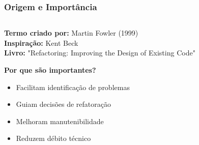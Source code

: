 \documentclass[aspectratio=169]{beamer}
\begin{document}
\begin{frame}
\frametitle{Origem e Importância}
\begin{columns}
\begin{column}{0.6\textwidth}
\footnotesize
\textbf{Termo criado por:} Martin Fowler (1999) \\
\textbf{Inspiração:} Kent Beck \\
\textbf{Livro:} "Refactoring: Improving the Design of Existing Code"

\vspace{0.5cm}
\textbf{Por que são importantes?}
\begin{itemize}
    \item Facilitam identificação de problemas
    \item Guiam decisões de refatoração
    \item Melhoram manutenibilidade
    \item Reduzem débito técnico
\end{itemize}
\end{column}

\begin{column}{0.4\textwidth}
\begin{center}
\end{center}
\end{column}
\end{columns}
\end{frame}
\end{document}
